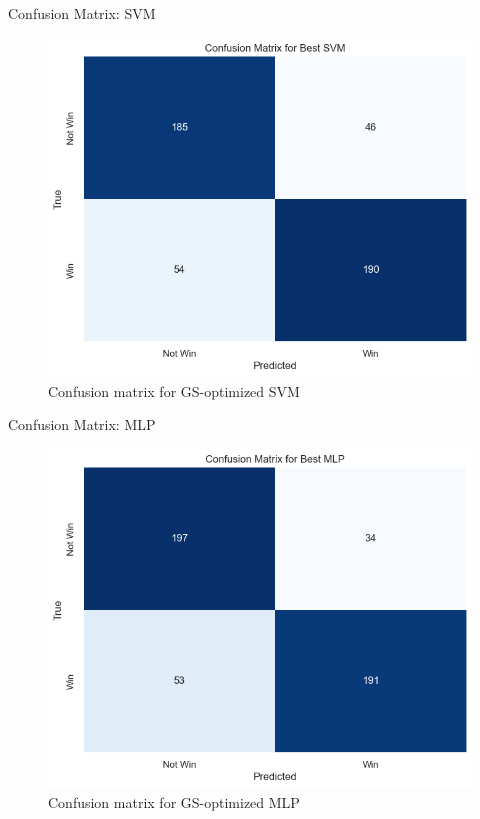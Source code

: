 \documentclass{beamer}
\begin{document}
\begin{frame}{Confusion Matrix: SVM}
    \begin{figure}
        \centering
        \includegraphics[width=0.7\linewidth]{images/cm_svm.png}
        \caption{Confusion matrix for GS-optimized SVM}
        \label{fig:enter-label}
    \end{figure}
\end{frame}

\begin{frame}{Confusion Matrix: MLP}
    \begin{figure}
        \centering
        \includegraphics[width=0.7\linewidth]{images/cm_mlp.png}
        \caption{Confusion matrix for GS-optimized MLP}
        \label{fig:enter-label}
    \end{figure}
\end{frame}

\end{document}
